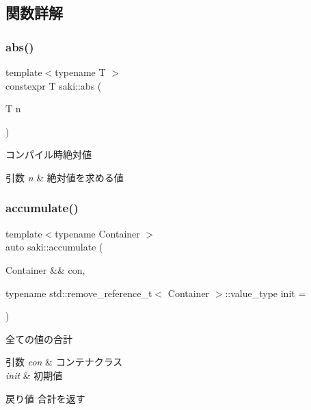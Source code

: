 \subsection{関数詳解}
\mbox{\label{namespacesaki_a012046e05c5909bb34ca3e609ca74ff3}} 
\subsubsection{\texorpdfstring{abs()}{abs()}}
{\footnotesize\ttfamily template$<$typename T $>$ \\
constexpr T saki\+::abs (\begin{DoxyParamCaption}\item[{T}]{n }\end{DoxyParamCaption})}



コンパイル時絶対値 


\begin{DoxyParams}{引数}
{\em n} & 絶対値を求める値 \\
\hline
\end{DoxyParams}
\mbox{\label{namespacesaki_a981cc67b0d421b1836678c3ac4069afd}} 
\subsubsection{\texorpdfstring{accumulate()}{accumulate()}\hspace{0.1cm}{\footnotesize\ttfamily [1/2]}}
{\footnotesize\ttfamily template$<$typename Container $>$ \\
auto saki\+::accumulate (\begin{DoxyParamCaption}\item[{Container \&\&}]{con,  }\item[{typename std\+::remove\+\_\+reference\+\_\+t$<$ Container $>$\+::value\+\_\+type}]{init = {} }\end{DoxyParamCaption})}



全ての値の合計 


\begin{DoxyParams}{引数}
{\em con} & コンテナクラス \\
\hline
{\em init} & 初期値 \\
\hline
\end{DoxyParams}
\begin{DoxyReturn}{戻り値}
合計を返す 
\end{DoxyReturn}
\mbox{\label{namespacesaki_acb8c3f650d3b5d3b06259b91bd7ad85d}} 
